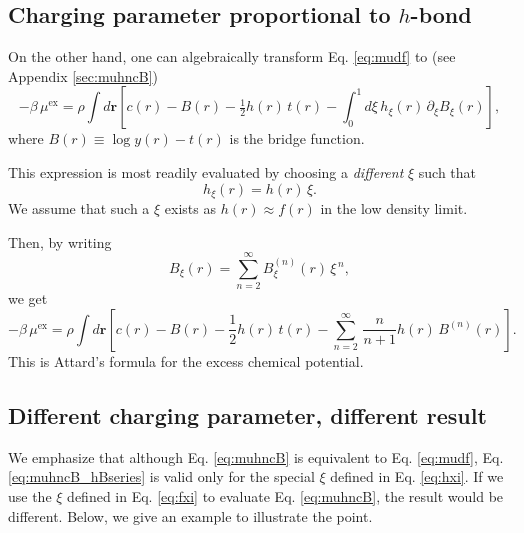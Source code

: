 \documentclass[notitlepage, preprint]{revtex4-1}
\newcommand{\vct}[1]{\mathbf{#1}}
\providecommand{\vr}{} %
\renewcommand{\vr}{\vct{r}}
\newcommand{\supex}[1]{ { { #1 }^{ \mathrm{ex} } } }
\newcommand{\muex}{\supex{\mu}}
\begin{document}
\subsection{Charging parameter proportional to $h$-bond}



On the other hand,
one can algebraically transform Eq. \eqref{eq:mudf}
to (see Appendix \ref{sec:muhncB})
%
\begin{equation}
  -\beta \, \muex
=
  \rho \int d\vr
  \left[ c(r) - B(r) - \tfrac{1}{2} h(r) \, t(r)
  - \int_0^1 d\xi \, h_\xi(r) \, \partial_\xi B_\xi(r) \right],
\label{eq:muhncB}
\end{equation}
where $B(r) \equiv \log y(r) - t(r)$ is the bridge function.

This expression is most readily evaluated
by choosing a \emph{different} $\xi$ such that
\begin{equation}
  h_{\xi}(r) = h(r) \, \xi.
  \label{eq:hxi}
\end{equation}
We assume that such a $\xi$ exists
as $h(r) \approx f(r)$ in the low density limit.

Then, by writing
\begin{equation}
  B_{\xi}(r) = \sum_{n = 2}^\infty B^{(n)}_{\xi}(r) \, {\xi}^{\, n},
\label{eq:Bxi}
\end{equation}
we get\cite{attard1991}
\begin{equation}
  -\beta \, \muex
=
  \rho \int d\vr
  \left[ c(r) - B(r) - \frac{1}{2} h(r) \, t(r)
   - \sum_{n = 2}^\infty \, \frac{n}{n+1} h(r) \, B^{(n)}(r) \right].
\label{eq:muhncB_hBseries}
\end{equation}
This is Attard's formula for the excess chemical potential.




\subsection{Different charging parameter, different result}



We emphasize that although
Eq. \eqref{eq:muhncB} is equivalent to Eq. \eqref{eq:mudf},
Eq. \eqref{eq:muhncB_hBseries} is valid
only for the special $\xi$ defined in Eq. \eqref{eq:hxi}.
%
If we use the $\xi$ defined in Eq. \eqref{eq:fxi}
to evaluate Eq. \eqref{eq:muhncB},
the result would be different.
%
Below, we give an example to illustrate the point.
\end{document}
